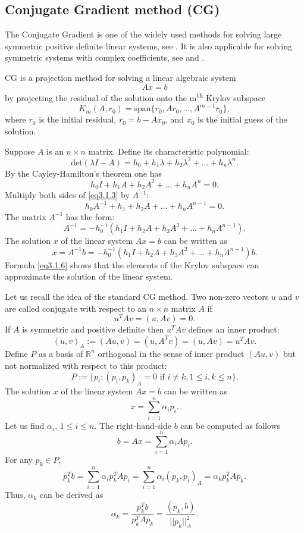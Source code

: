 \documentclass[12pt]{elsarticle}
\numberwithin{equation}{section}
\newcommand{\R}{{\mathbb R}}
\newcommand{\bee}{\begin{equation*}}
\newcommand{\eee}{\end{equation*}}
\newcommand{\be}{\begin{equation}}
\newcommand{\ee}{\end{equation}}
\begin{document}
\subsection{Conjugate Gradient method (CG)} \label{sec3.1}
The Conjugate Gradient is one of the widely used methods for solving large symmetric  positive definite linear systems, see \cite{CG}. It is also applicable for solving symmetric systems with complex coefficients, see \cite{COCG} and \cite{Clemens}.

CG is a projection method for solving a linear algebraic  system
\bee
	Ax=b
\eee
by projecting  the residual of the solution onto the m\textsuperscript{th} Krylov subspace
\be \label{eq3.1.1}
	K_m(A,r_0)=\text{span}\{r_0, Ar_0, \ldots, A^{m-1}r_0\},
\ee
where $r_0$ is the initial residual, $r_0=b-Ax_0$, and $x_0$ is the initial guess of the solution.

Suppose $A$ is an $n \times n$ matrix. Define its characteristic polynomial:
\be \label{eq3.1.2}
	\text{det}(\lambda I - A)=h_0+h_1 \lambda+h_2 \lambda^2+\ldots + h_n\lambda^n.
\ee
By the Cayley-Hamilton's theorem one has
\be \label{eq3.1.3}
	h_0I+h_1 A+h_2 A^2+\ldots + h_n A^n=0.
\ee
Multiply both sides of \eqref{eq3.1.3} by $A^{-1}$:
\be \label{eq3.1.4}
	h_0 A^{-1}+h_1 +h_2 A+\ldots + h_n A^{n-1}=0.
\ee
The matrix $A^{-1}$ has the form:
\be \label{eq3.1.5}
	A^{-1}=-h_0^{-1}(h_1I +h_2 A+h_3 A^2+\ldots + h_n A^{n-1}).
\ee
The solution $x$ of the linear system $Ax=b$ can be written as
\be \label{eq3.1.6}
	x=A^{-1}b=-h_0^{-1}(h_1 I +h_2 A+h_3 A^2+\ldots + h_n A^{n-1})b.
\ee
Formula \eqref{eq3.1.6} shows that the elements of the Krylov subspace can approximate  the solution of the linear system.

Let us recall the idea of the standard CG method.
Two non-zero vectors $u$ and $v$ are called conjugate with respect to an $n\times n$ matrix $A$ if
\be \label{eq3.1.7}
	u^T Av=(u,Av)=0.
\ee
If $A$ is symmetric and positive definite  then $u^TAv$ defines an inner product:
\be \label{eq3.1.8}
	(u,v)_A := (Au,v)=(u,A^Tv)=(u,Av)=u^TAv.
\ee
Define $P$ as a basis of $\R^n$ orthogonal in the sense of inner product $(Au,v)$ but not normalized
with respect to this product:
\be \label{eq3.1.9}
	P:=\{p_i: (p_i,p_k)_A=0 \text{ if } i\ne k, 1 \le i, k \le n \}.
\ee
The solution $x$ of the linear system $Ax=b$ can be written as
\be \label{eq3.1.10}
	x=\sum_{i=1}^{n} \alpha_i p_i.
\ee
Let us find $\alpha_i$, $1 \le i \le n$. The right-hand-side $b$ can be computed as follows
\be \label{eq3.1.11}
	b=Ax=\sum_{i=1}^{n} \alpha_i Ap_i.
\ee
For any $p_k \in P$,
\be \label{eq3.1.12}
	p_k^T b=\sum_{i=1}^{n} \alpha_i p_k^T A p_i=\sum_{i=1}^{n} \alpha_i (p_k,p_i)_A=\alpha_k p_k^T Ap_k.
\ee
Thus, $\alpha_k$ can be derived as
\be \label{eq3.1.13}
	\alpha_k=\frac{p_k^T b}{p_k^T Ap_k}=\frac{(p_k,b)}{||p_k||_A^2}.
\ee
\end{document}
